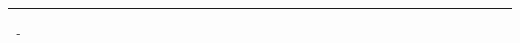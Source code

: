 \begin{titlepage}
	\vspace*{5cm} 
	\centering%
	{\Huge \bfseries \scshape \Title \par}%
	\vspace*{0.3cm}
	{\color{\pColor} \hrule}
	\vspace*{0.15cm}
	{\large \scshape \Subtitle \par}

    
    \vfill
    \raggedright%
    {\large \it \Author\ - \Institution \par}%
    {\large \Date \par}%
\end{titlepage}

\pagebreak